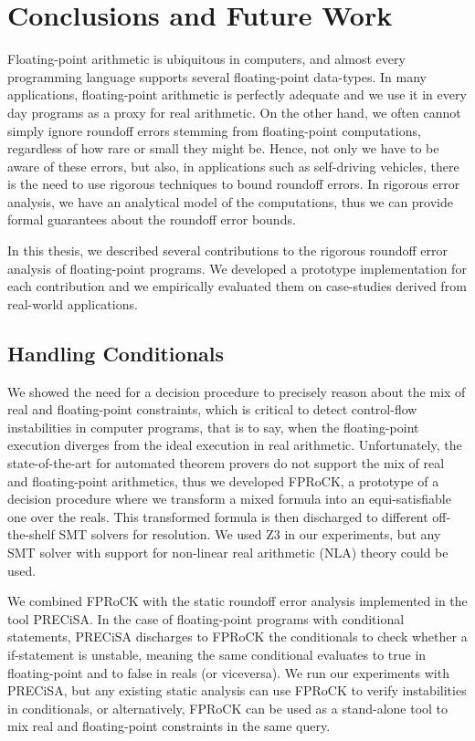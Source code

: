 
\chapter{Conclusions and Future Work}
\label{sec:conclusion}
%
\setupuuchapterbib
%
Floating-point arithmetic is ubiquitous in computers, and almost every programming language supports several floating-point data-types.
%
In many applications, floating-point arithmetic is perfectly adequate and we use it in every day programs as a proxy for real arithmetic.
%
On the other hand, we often cannot simply ignore roundoff errors stemming from floating-point computations, regardless of how rare or small they might be.
%
Hence, not only we have to be aware of these errors, but also, in applications such as self-driving vehicles, there is the need to use rigorous techniques to bound roundoff errors. 
%
In rigorous error analysis, we have an analytical model of the computations, thus we can provide formal guarantees about the roundoff error bounds.
%

In this thesis, we described several contributions to the rigorous roundoff error analysis of floating-point programs.
%
We developed a prototype implementation for each contribution and we empirically evaluated them on case-studies derived from real-world applications.
%

\section{Handling Conditionals}
%
We showed the need for a decision procedure to precisely reason about the mix of real and floating-point constraints, which is critical to detect control-flow instabilities in computer programs, that is to say, when the floating-point execution diverges from the ideal execution in real arithmetic.
%
Unfortunately, the state-of-the-art for automated theorem provers do not support the mix of real and floating-point arithmetics, thus we developed FPRoCK, a prototype of a decision procedure where we transform a mixed formula
into an equi-satisfiable one over the reals.
%
This transformed formula is then discharged to different off-the-shelf SMT solvers for resolution.
%
We used Z3 in our experiments, but any SMT solver with support for non-linear real arithmetic (NLA) theory could be used.
%

We combined FPRoCK with the static roundoff error analysis implemented in the tool PRECiSA.
%
In the case of floating-point programs with conditional statements, PRECiSA discharges to FPRoCK the conditionals to check whether a if-statement is unstable, meaning the same conditional evaluates to true in floating-point and to false in reals (or viceversa).
%
We run our experiments with PRECiSA, but any existing static analysis can use FPRoCK to verify instabilities in conditionals, or alternatively, FPRoCK can be used as a stand-alone tool to mix real and floating-point constraints in the same query.
%

